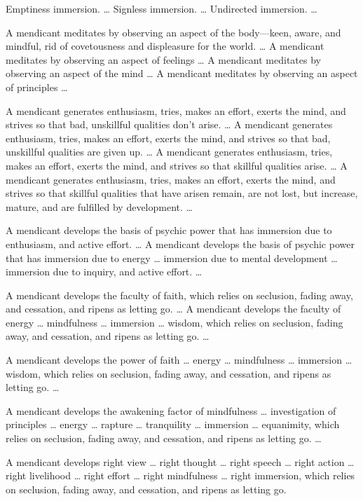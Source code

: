 \documentclass[12pt,openany]{book}%
\begin{document}
Emptiness immersion. … Signless immersion. … Undirected immersion. … 

A mendicant meditates by observing an aspect of the body—keen, aware, and mindful, rid of covetousness and displeasure for the world. … A mendicant meditates by observing an aspect of feelings … A mendicant meditates by observing an aspect of the mind … A mendicant meditates by observing an aspect of principles … 

A mendicant generates enthusiasm, tries, makes an effort, exerts the mind, and strives so that bad, unskillful qualities don’t arise. … A mendicant generates enthusiasm, tries, makes an effort, exerts the mind, and strives so that bad, unskillful qualities are given up. … A mendicant generates enthusiasm, tries, makes an effort, exerts the mind, and strives so that skillful qualities arise. … A mendicant generates enthusiasm, tries, makes an effort, exerts the mind, and strives so that skillful qualities that have arisen remain, are not lost, but increase, mature, and are fulfilled by development. … 

A mendicant develops the basis of psychic power that has immersion due to enthusiasm, and active effort. … A mendicant develops the basis of psychic power that has immersion due to energy … immersion due to mental development … immersion due to inquiry, and active effort. … 

A mendicant develops the faculty of faith, which relies on seclusion, fading away, and cessation, and ripens as letting go. … A mendicant develops the faculty of energy … mindfulness … immersion … wisdom, which relies on seclusion, fading away, and cessation, and ripens as letting go. … 

A mendicant develops the power of faith … energy … mindfulness … immersion … wisdom, which relies on seclusion, fading away, and cessation, and ripens as letting go. … 

A mendicant develops the awakening factor of mindfulness … investigation of principles … energy … rapture … tranquility … immersion … equanimity, which relies on seclusion, fading away, and cessation, and ripens as letting go. … 

A mendicant develops right view … right thought … right speech … right action … right livelihood … right effort … right mindfulness … right immersion, which relies on seclusion, fading away, and cessation, and ripens as letting go. 
\end{document}
